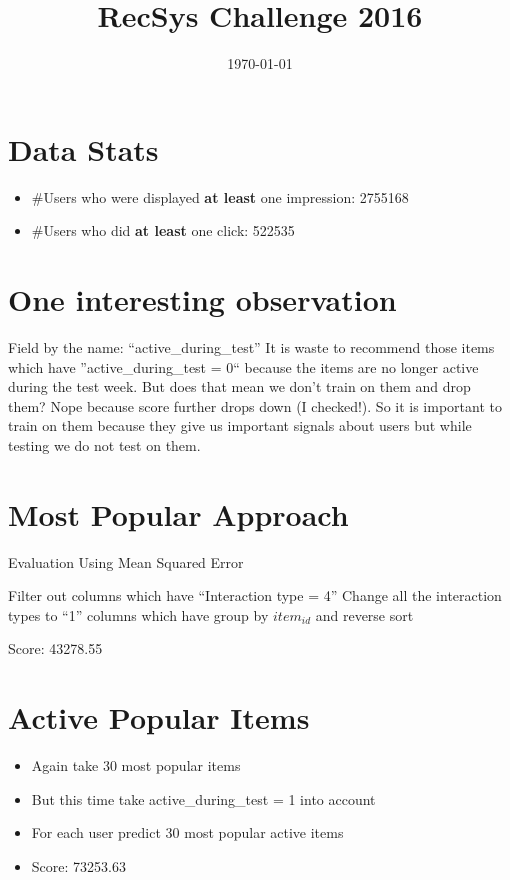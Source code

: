 \documentclass{article}
\begin{document}
\title{RecSys Challenge 2016}
\date{\today}
\maketitle
\section{Data Stats}
\begin{itemize}
 \item \#Users who were displayed \textbf{at least} one impression: 2755168
 \item \#Users who did \textbf{at least} one click: 522535
\end{itemize}

\section{One interesting observation}
Field by the name: ``active\_during\_test''
It is waste to recommend those items which have ''active\_during\_test = 0`` because the items are no longer active during the test week. But does that mean we don't train on them and drop 
them? Nope because score further drops down (I checked!). So it is important to train on them because they give us important signals about users but while testing we do not test on them.
\section{Most Popular Approach}

\begin{algorithm}
\caption{Evaluation Using Mean Squared Error}
\begin{algorithmic}[1] 
\State Filter out columns which have ``Interaction type = 4''
\State Change all the interaction types to ``1'' columns which have
\State group by $item_{id}$ and reverse sort
\end{algorithmic}
\end{algorithm}
Score: 43278.55

\section{Active Popular Items}
\begin{itemize}
 \item Again take 30 most popular items
 \item But this time take active\_during\_test = 1 into account
 \item For each user predict 30 most popular active items
 \item Score: 73253.63 	
\end{itemize}
\end{document}
